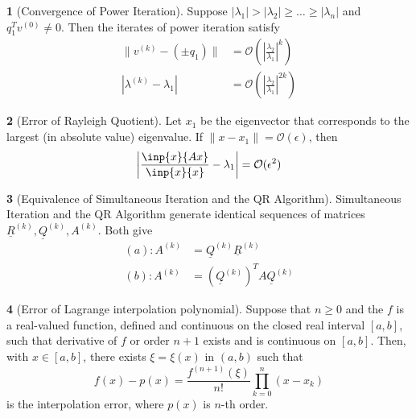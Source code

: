 \documentclass[12pt]{article}
\theoremstyle{definition}
\newtheorem{theorem}{\color{ForestGreen}{\textbf{Theorem}}}
\newcommand{\e}{\epsilon}
\newcommand{\norm}[1]{\lVert#1\rVert}
\begin{document}
\begin{theorem}[Convergence of Power Iteration]
Suppose $|\lambda_1|  > |\lambda_2| \geq \ldots \geq |\lambda_n|$ and $q_1^T v^{(0)} \neq 0$. Then the iterates of power iteration satisfy
\begin{align}
\norm{v^{(k)} - (\pm q_1)} &= \mathcal{O}\left( \left\vert \frac{\lambda_2}{\lambda_1} \right\vert^k \right) \tag{error of eigenvector} \\
|\lambda^{(k)} - \lambda_1 | &= \mathcal{O}\left( \left\vert \frac{\lambda_2}{\lambda_1} \right\vert^{2k} \right) \tag{error of eigenvalue}
\end{align}
\end{theorem}

\begin{theorem}[Error of Rayleigh Quotient]
Let $x_1$ be the eigenvector that corresponds to the largest (in absolute value) eigenvalue. If $\norm{x - x_1} = \mathcal{O}(\e)$, then
\begin{equation}
\left\vert \frac{\inp{x}{Ax}}{\inp{x}{x}}  - \lambda_1 \right\vert = \mathcal{O}(\e^2)
\end{equation}
\end{theorem}

\begin{theorem}[Equivalence of Simultaneous Iteration and the QR Algorithm]
Simultaneous Iteration and the QR Algorithm generate identical sequences of matrices $\underline R^{(k)}, \underline Q^{(k)}, A^{(k)}$. Both give
\begin{align}
(a): A^{(k)} &= \underline Q^{(k)} \underline R^{(k)} \tag{$QR$ factorization of the $k$th power of $A$}\\
(b): A^{(k)} &= (\underline Q^{(k)})^T A \underline Q^{(k)} \tag{projection}
\end{align}
\end{theorem}

\begin{theorem}[Error of Lagrange interpolation polynomial]
Suppose that $n\geq 0$ and the $f$ is a real-valued function, defined and continuous on the closed real interval $[a,b]$, such that derivative of $f$ or order $n+1$ exists and is continuous on $[a,b]$. Then, with $x \in [a,b]$, there exists $\xi = \xi(x)$ in $(a,b)$ such that
\begin{equation}
f(x) - p(x) = \frac{f^{(n+1)}(\xi)}{n!} \prod_{k=0}^n (x-x_k)
\end{equation}
is the interpolation error, where $p(x)$ is $n$-th order.
\end{theorem}
\end{document}

